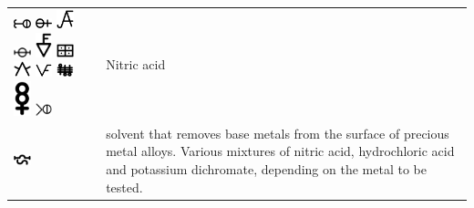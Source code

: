 \documentclass[british,final,landscape]{scrartcl}
\begin{document}
\begin{refsection}
\begin{supertabular}{p{0.3\textwidth}p{0.34\textwidth}p{0.34\textwidth}}
   \includegraphics[width=5mm]{Compounds/AquaForte3} \includegraphics[width=5mm]{Compounds/AquaForte4} \includegraphics[width=5mm]{Compounds/AquaForte5} \includegraphics[width=5mm]{Compounds/AquaForte6} \includegraphics[width=5mm]{Compounds/AquaForte7} \includegraphics[width=5mm]{Compounds/AquaForte8} \includegraphics[width=5mm]{Compounds/AquaForte9} \includegraphics[width=5mm]{Compounds/AquaForte10} \includegraphics[width=5mm]{Compounds/AquaForte11} \includegraphics[width=5mm]{Compounds/AquaForte12} \includegraphics[width=5mm]{Compounds/AquaForte13} &  & Nitric acid  \\
   \includegraphics[width=5mm]{Compounds/AquaGradaria} &  & solvent that removes base metals from the surface of precious metal alloys. Various mixtures of nitric acid, hydrochloric acid and potassium dichromate, depending on the metal to be tested. \\

\end{supertabular}
\end{refsection}
\end{document}
